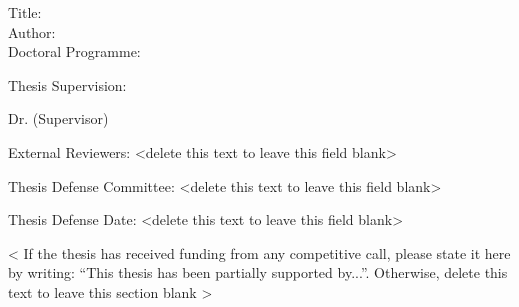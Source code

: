 
\begin{spacing}{1.3}
Title: \thesisTitle \\
Author: \thesisAuthor \\
Doctoral Programme:	 \DoctoralProgramme
\end{spacing}
Thesis Supervision: 
\begin{mydescription}
    \item Dr. \supervisorDetails  (Supervisor)
\end{mydescription}

\vspace{10 mm}
External Reviewers: <delete this text to leave this field blank>

\vspace{30 mm}

Thesis Defense Committee: <delete this text to leave this field blank>


\vspace{50mm}



Thesis Defense Date: <delete this text to leave this field blank>



\vspace{\fill}
\begin{spacing}{1.0}
< If the thesis has received funding from any competitive call, please state it here by writing: “This thesis has been partially supported by...”. Otherwise, delete this text to leave this section blank >
\end{spacing}

